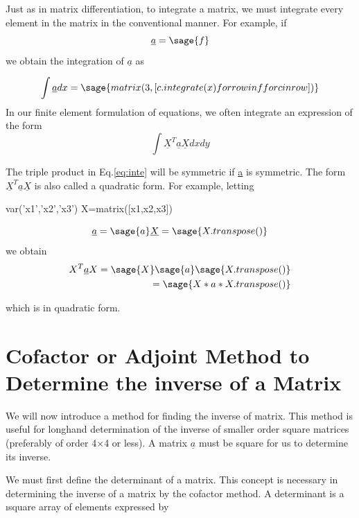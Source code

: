\documentclass[12pt]{report}
\newcommand{\lab}[1]{
	Eq.\ref{#1}
}
\begin{document}
Just as in matrix differentiation, to integrate a matrix, we must
integrate every element in the matrix in the conventional manner. For
example, if
$$ \underline{a} = \sage{f}$$
we obtain the integration of $\underline{a}$ as

$$\int \underline{a}dx = \sage{matrix(3,[c.integrate(x) for row in f for c in row ])
}$$
In our finite element formulation of equations, we often integrate an
expression of the form
\begin{equation}
	\int \underline{X}^T\underline{a}\underline{X} dx dy 
	\label{eq:inte}
\end{equation}

The triple product in \lab{eq:inte} will be symmetric 
if \underline{a} is symmetric. The form 
$\underline{X}^T\underline{a}\underline{X}$ is also called
a quadratic form. For
example, letting
\begin{sagesilent}
	var('x1','x2','x3')
	X=matrix([x1,x2,x3])
\end{sagesilent}

$$\underline{a} = \sage{a} \underline{X}= \sage{X.transpose()}$$
we obtain
\begin{align}
	{X}^T\underline{a}{X} = \sage{X}\sage{a}\sage{X.transpose()} \nonumber\\
	=\sage{X*a*X.transpose()}
\end{align}

which is in quadratic form.


\section{Cofactor or Adjoint Method to Determine the inverse of a Matrix}

We will now introduce a method for finding the inverse of matrix. This
method is useful for longhand determination of the inverse of smaller
order square matrices (preferably of order 4$\times$4 or less). A
matrix $\underline{a}$ must be square for us to determine its inverse.


We must first define the determinant of a matrix. This concept is
necessary in determining the inverse of a matrix by the cofactor
method. A determinant is a \i{square array of elements expressed by}
\end{document}
